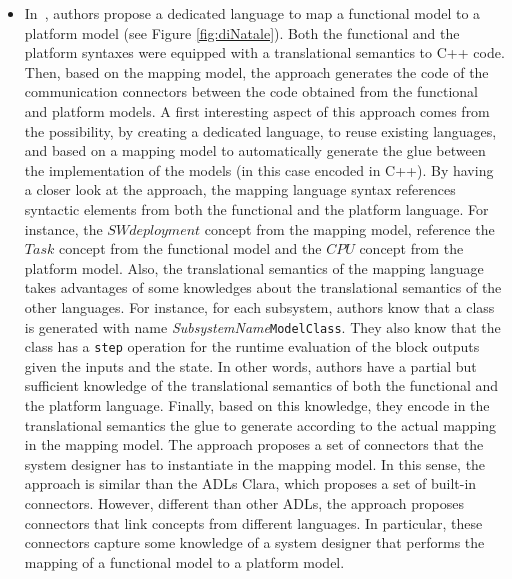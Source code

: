 \begin{itemize}
         	\item In~\cite{dinatale}, authors propose a dedicated language to map a functional model to a platform model (see Figure \ref{fig:diNatale}). Both the functional and the platform syntaxes were equipped with a translational semantics to C++ code. Then, based on the mapping model, the approach generates the code of the communication connectors between the code obtained from the functional and platform models. A first interesting aspect of this approach comes from the possibility, by creating a dedicated language, to reuse existing languages, and based on a mapping model to automatically generate the glue between the implementation of the models (in this case encoded in C++). By having a closer look at the approach, the mapping language syntax references syntactic elements from both the functional and the platform language. For instance, the $SWdeployment$ concept from the mapping model, reference the $Task$ concept from the functional model and the $CPU$ concept from the platform model. Also, the translational semantics of the mapping language takes advantages of some knowledges about the translational semantics of the other languages. For instance, for each subsystem, authors know that a class is generated with name \emph{SubsystemName}\texttt{ModelClass}. They also know that the class has a \texttt{step} operation for the runtime evaluation of the block outputs given the inputs and the state. In other words, authors have a partial but sufficient knowledge of the translational semantics of both the functional and the platform language. Finally, based on this knowledge, they encode in the translational semantics the glue to generate according to the actual mapping in the mapping model. The approach proposes a set of connectors that the system designer has to instantiate in the mapping model. In this sense, the approach is similar than the ADLs Clara, which proposes a set of built-in connectors. However, different than other ADLs, the approach proposes connectors that link concepts from different languages. In particular, these connectors capture some knowledge of a system designer that performs the mapping of a functional model to a platform model.
         	
         	
         \end{itemize}
         

